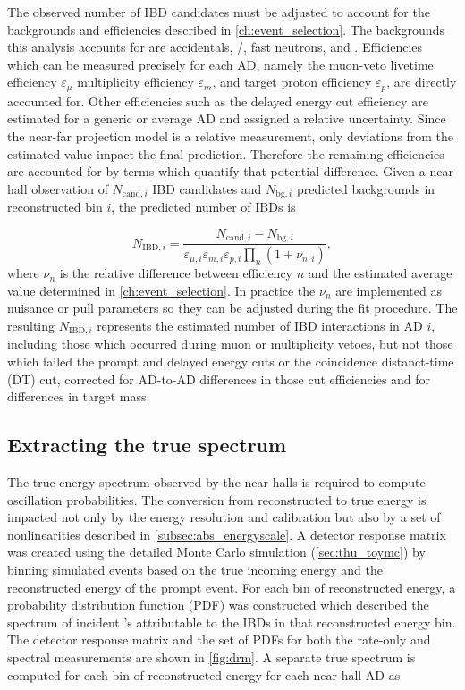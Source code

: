 The observed number of IBD candidates must be adjusted
to account for the backgrounds and efficiencies described in \cref{ch:event_selection}.
The backgrounds this analysis accounts for are
accidentals, \li{}/\he{}, fast neutrons, and \amc{}.
Efficiencies which can be measured precisely for each AD,
namely
the muon-veto livetime efficiency $\varepsilon_\mu$
multiplicity efficiency $\varepsilon_m$,
and target proton efficiency $\varepsilon_p$,
are directly accounted for.
Other efficiencies such as the delayed energy cut efficiency
are estimated for a generic or average AD and assigned a relative uncertainty.
Since the near-far projection model is a relative measurement,
only deviations from the estimated value
impact the final prediction.
Therefore the remaining efficiencies are accounted for
by terms which quantify that potential difference.
Given a near-hall observation of $N_{\text{cand},i}$ IBD candidates
and $N_{\text{bg},i}$ predicted backgrounds in reconstructed bin $i$,
the predicted number of IBDs is

\begin{equation}\label{eq:near_hall_bg_eff}
    N_{\text{IBD},i} =
    \frac{N_{\text{cand},i} - N_{\text{bg},i}}{
        \varepsilon_{\mu,i}\varepsilon_{m,i}\varepsilon_{p,i}\prod_n(1+\nu_{n,i})
    },
\end{equation}
where $\nu_n$ is the relative difference between efficiency $n$
and the estimated average value determined in \cref{ch:event_selection}.
In practice the $\nu_n$ are implemented as nuisance or pull parameters
so they can be adjusted during the fit procedure.
The resulting $N_{\text{IBD},i}$ represents
the estimated number of IBD interactions in AD $i$,
including those which occurred during muon or multiplicity vetoes,
but not those which failed the prompt and delayed energy cuts
or the coincidence distanct-time (DT) cut,
corrected for AD-to-AD differences in those cut efficiencies
and for differences in target mass.


\subsection{Extracting the true \texorpdfstring{\nuebar{}}{antineutrino} spectrum}
\label{subsec:reco_to_true_energy}

The true \nuebar{} energy spectrum observed by the near halls
is required to compute oscillation probabilities.
The conversion from reconstructed to true energy
is impacted not only by the energy resolution and calibration
but also by a set of nonlinearities described in \cref{subsec:abs_energyscale}.
A detector response matrix was created
using the detailed Monte Carlo simulation (\cref{sec:thu_toymc})
by binning simulated events based on the true incoming \nuebar{} energy
and the reconstructed energy of the prompt event.
For each bin of reconstructed energy,
a probability distribution function (PDF) was constructed
which described the spectrum of incident \nuebar{}'s
attributable to the IBDs in that reconstructed energy bin.
The detector response matrix and the set of PDFs
for both the rate-only and spectral measurements
are shown in \cref{fig:drm}.
A separate true \nuebar{} spectrum is computed
for each bin of reconstructed energy for each near-hall AD as

